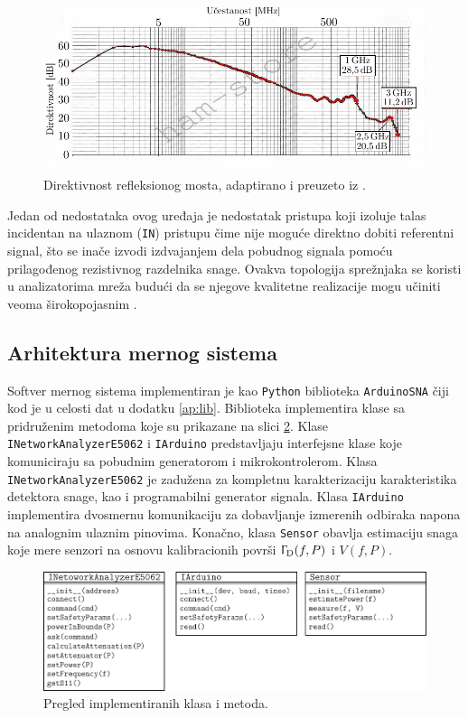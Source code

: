 \documentclass[a4paper, 12pt, diplomski]{etf}
\begin{document}
%
\begin{figure}[ht!]
    \centering
    \includegraphics{fig/grafik_swr.pdf}
    \caption{Direktivnost refleksionog mosta, 
    adaptirano i preuzeto iz \cite{transverters_store}.}
    \label{fig:transverters_store}
\end{figure}

Jedan od nedostataka ovog uređaja je nedostatak 
 pristupa koji izoluje talas incidentan na 
 ulaznom (\texttt{IN}) pristupu čime nije moguće 
 direktno dobiti referentni signal, što se 
 inače izvodi izdvajanjem dela pobudnog signala
 pomoću prilagođenog rezistivnog razdelnika 
 snage. Ovakva topologija sprežnjaka se koristi 
 u analizatorima mreža budući da se njegove 
 kvalitetne realizacije mogu učiniti veoma
 širokopojasnim \cite{mpk}.

\subsection{Arhitektura mernog sistema}   

Softver mernog sistema implementiran je kao 
\texttt{Python} biblioteka \texttt{ArduinoSNA} čiji kod je u celosti
dat u dodatku \ref{ap:lib}. 
Biblioteka implementira klase sa pridruženim metodoma 
koje su prikazane na slici \ref{fig:py}. Klase 
\verb|INetworkAnalyzerE5062| i \verb|IArduino| predstavljaju
interfejsne klase koje komuniciraju sa pobudnim
generatorom
i mikrokontrolerom. Klasa \verb|INetworkAnalyzerE5062| je zadužena 
za kompletnu karakterizaciju karakteristika detektora snage, 
kao i programabilni generator signala. Klasa \verb|IArduino| 
implementira dvosmernu komunikaciju za dobavljanje izmerenih
odbiraka napona na analognim ulaznim pinovima. Konačno, 
klasa \verb|Sensor| obavlja estimaciju snaga koje mere senzori 
na osnovu kalibracionih površi $\Upgamma_{\rm D}(f, P)$ 
i $V(f, P)$.
\verb||
\begin{figure}[ht!]
    \centering
    \includegraphics{fig/class.pdf}
    \caption{Pregled implementiranih klasa i metoda.}
    \label{fig:py}
\end{figure}
\end{document}
